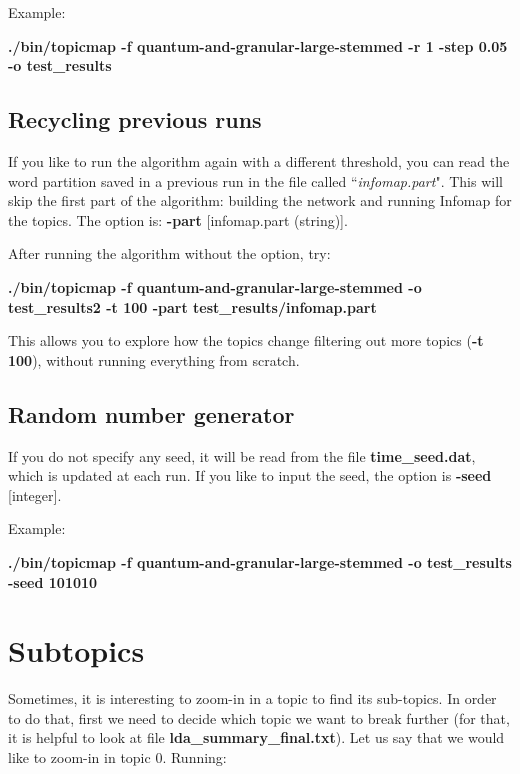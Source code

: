 \documentclass[11pt]{article}
\begin{document}
Example:

\textbf{./bin/topicmap -f quantum-and-granular-large-stemmed -r 1 -step 0.05 -o test\_results}




\subsection{Recycling previous runs}

If you like to run the algorithm again with a different threshold, you can read the word partition saved in a previous run in the file called ``\textit{infomap.part}". This will skip the first part of the algorithm: building the network and running Infomap for the topics. The option is: \textbf{-part} [infomap.part (string)].

After running the algorithm without the option, try:

\textbf{./bin/topicmap -f quantum-and-granular-large-stemmed -o test\_results2 -t 100 -part test\_results/infomap.part }

\small This allows you to explore how the topics change filtering out more topics (\textbf{-t 100}), without running everything from scratch.

\normalsize


\subsection{Random number generator}

If you do not specify any seed, it will be read from the file \textbf{time\_seed.dat}, which is updated at each run.
If you like to input the seed, the option is \textbf{-seed} [integer].

Example:

\textbf{./bin/topicmap -f quantum-and-granular-large-stemmed -o test\_results -seed 101010 }





\section{Subtopics}


Sometimes, it is interesting to zoom-in in a topic to find its sub-topics. In order to do that, first we need to decide which topic we want to break further
(for that, it is helpful to look at file \textbf{lda\_summary\_final.txt}). Let us say that we would like to zoom-in in topic 0.
Running:
\end{document}
